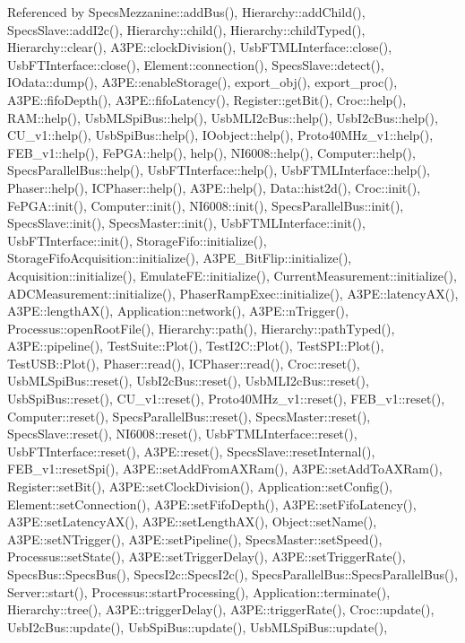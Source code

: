 Referenced by Specs\+Mezzanine\+::add\+Bus(), Hierarchy\+::add\+Child(), Specs\+Slave\+::add\+I2c(), Hierarchy\+::child(), Hierarchy\+::child\+Typed(), Hierarchy\+::clear(), A3\+P\+E\+::clock\+Division(), Usb\+F\+T\+M\+L\+Interface\+::close(), Usb\+F\+T\+Interface\+::close(), Element\+::connection(), Specs\+Slave\+::detect(), I\+Odata\+::dump(), A3\+P\+E\+::enable\+Storage(), export\+\_\+obj(), export\+\_\+proc(), A3\+P\+E\+::fifo\+Depth(), A3\+P\+E\+::fifo\+Latency(), Register\+::get\+Bit(), Croc\+::help(), R\+A\+M\+::help(), Usb\+M\+L\+Spi\+Bus\+::help(), Usb\+M\+L\+I2c\+Bus\+::help(), Usb\+I2c\+Bus\+::help(), C\+U\+\_\+v1\+::help(), Usb\+Spi\+Bus\+::help(), I\+Oobject\+::help(), Proto40\+M\+Hz\+\_\+v1\+::help(), F\+E\+B\+\_\+v1\+::help(), Fe\+P\+G\+A\+::help(), help(), N\+I6008\+::help(), Computer\+::help(), Specs\+Parallel\+Bus\+::help(), Usb\+F\+T\+Interface\+::help(), Usb\+F\+T\+M\+L\+Interface\+::help(), Phaser\+::help(), I\+C\+Phaser\+::help(), A3\+P\+E\+::help(), Data\+::hist2d(), Croc\+::init(), Fe\+P\+G\+A\+::init(), Computer\+::init(), N\+I6008\+::init(), Specs\+Parallel\+Bus\+::init(), Specs\+Slave\+::init(), Specs\+Master\+::init(), Usb\+F\+T\+M\+L\+Interface\+::init(), Usb\+F\+T\+Interface\+::init(), Storage\+Fifo\+::initialize(), Storage\+Fifo\+Acquisition\+::initialize(), A3\+P\+E\+\_\+\+Bit\+Flip\+::initialize(), Acquisition\+::initialize(), Emulate\+F\+E\+::initialize(), Current\+Measurement\+::initialize(), A\+D\+C\+Measurement\+::initialize(), Phaser\+Ramp\+Exec\+::initialize(), A3\+P\+E\+::latency\+A\+X(), A3\+P\+E\+::length\+A\+X(), Application\+::network(), A3\+P\+E\+::n\+Trigger(), Processus\+::open\+Root\+File(), Hierarchy\+::path(), Hierarchy\+::path\+Typed(), A3\+P\+E\+::pipeline(), Test\+Suite\+::\+Plot(), Test\+I2\+C\+::\+Plot(), Test\+S\+P\+I\+::\+Plot(), Test\+U\+S\+B\+::\+Plot(), Phaser\+::read(), I\+C\+Phaser\+::read(), Croc\+::reset(), Usb\+M\+L\+Spi\+Bus\+::reset(), Usb\+I2c\+Bus\+::reset(), Usb\+M\+L\+I2c\+Bus\+::reset(), Usb\+Spi\+Bus\+::reset(), C\+U\+\_\+v1\+::reset(), Proto40\+M\+Hz\+\_\+v1\+::reset(), F\+E\+B\+\_\+v1\+::reset(), Computer\+::reset(), Specs\+Parallel\+Bus\+::reset(), Specs\+Master\+::reset(), Specs\+Slave\+::reset(), N\+I6008\+::reset(), Usb\+F\+T\+M\+L\+Interface\+::reset(), Usb\+F\+T\+Interface\+::reset(), A3\+P\+E\+::reset(), Specs\+Slave\+::reset\+Internal(), F\+E\+B\+\_\+v1\+::reset\+Spi(), A3\+P\+E\+::set\+Add\+From\+A\+X\+Ram(), A3\+P\+E\+::set\+Add\+To\+A\+X\+Ram(), Register\+::set\+Bit(), A3\+P\+E\+::set\+Clock\+Division(), Application\+::set\+Config(), Element\+::set\+Connection(), A3\+P\+E\+::set\+Fifo\+Depth(), A3\+P\+E\+::set\+Fifo\+Latency(), A3\+P\+E\+::set\+Latency\+A\+X(), A3\+P\+E\+::set\+Length\+A\+X(), Object\+::set\+Name(), A3\+P\+E\+::set\+N\+Trigger(), A3\+P\+E\+::set\+Pipeline(), Specs\+Master\+::set\+Speed(), Processus\+::set\+State(), A3\+P\+E\+::set\+Trigger\+Delay(), A3\+P\+E\+::set\+Trigger\+Rate(), Specs\+Bus\+::\+Specs\+Bus(), Specs\+I2c\+::\+Specs\+I2c(), Specs\+Parallel\+Bus\+::\+Specs\+Parallel\+Bus(), Server\+::start(), Processus\+::start\+Processing(), Application\+::terminate(), Hierarchy\+::tree(), A3\+P\+E\+::trigger\+Delay(), A3\+P\+E\+::trigger\+Rate(), Croc\+::update(), Usb\+I2c\+Bus\+::update(), Usb\+Spi\+Bus\+::update(), Usb\+M\+L\+Spi\+Bus\+::update(), 